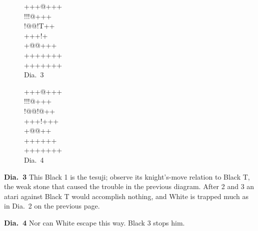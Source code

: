 \documentclass[mcrownvopaper,10pt,twopage,onecolumn,draft,showtrims]{memoir}
\begin{document}
\begin{figure}[ht]
    \begin{minipage}[c]{0.5\linewidth}
        \centering    
        {\gnos%
        +++@+++\\
        !!!@+++\\
        !@@!T++\\
        +++!{\gnosw{}}{\gnosb{}}+\\
        +@@++{\gnosb{}}+\\
        +++++++\\
        +++++++\\
        }
        Dia.\ 3
    \end{minipage}%
    \begin{minipage}[c]{0.5\linewidth}
        \centering    
        {\gnos%
        +++@+++\\
        !!!@+++\\
        !@@!@++\\
        +++!+++\\
        +@@+{\gnosw{}}{\gnosb{}}+\\
        ++++{\gnosb{}}++\\
        +++++++\\
        }
        Dia.\ 4
    \end{minipage}
\end{figure}

\noindent
\textbf{Dia.\ 3} This Black 1 is the tesuji; observe its knight's-move relation to
Black {\gnos T}, the weak stone that caused the trouble in the previous
diagram. After 2 and 3 an atari against Black {\gnos T} would accomplish
nothing, and White is trapped much as in Dia.\ 2 on the previous page. 

\noindent
\textbf{Dia.\ 4} Nor can White escape this way. Black 3 stops him.
\end{document}
